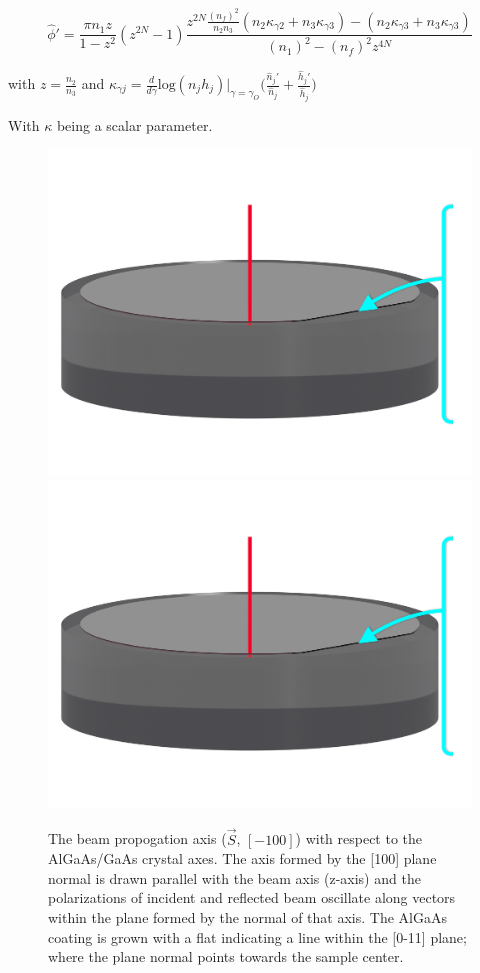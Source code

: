 \begin{equation}
\hat{\phi}' = \frac{\pi n_1 z}{1-z^2}(z^{2N} -1) \frac{z^{2N} \frac{(n_f)^2}{n_2 n_3}(n_2 \kappa_{\gamma 2} + n_3\kappa_{\gamma 3}) - (n_2 \kappa_{\gamma 3} + n_3\kappa_{\gamma 3})}{(n_1)^2 -(n_f)^2 z^{4N}}
\end{equation}

with $z = \frac{n_2}{n_3}$
and
$
\kappa_{\gamma j} = \frac{d}{d \gamma} \mathrm{log}(n_j h_j)|_{\gamma =\gamma_{O}} \bigg(\frac{\hat{n}_j'}{\hat{n}_j} +\frac{\hat{h}_j'}{\hat{h}_j} \bigg)
$

With $\kappa$ being a scalar parameter.

\begin{figure}[!ht]
    \begin{subcaptiongroup}
	    \includegraphics[width=.55\textwidth,page=1]{figs/ALGAAS/ALGAAS_HR_layers_1.pdf}
	    \label{HRiso}
	    \includegraphics[width=.55\textwidth,page=2]{figs/ALGAAS/ALGAAS_HR_layers_1.pdf}
	    \label{HRxsection}
    \end{subcaptiongroup}
\caption{The beam propogation axis ($\vec{S}$, $[-100]$) with respect to the AlGaAs/GaAs crystal axes. The axis formed by the [100] plane normal is drawn parallel with the beam axis (z-axis) and the polarizations of incident and reflected beam oscillate along vectors within the plane formed by the normal of that axis. The AlGaAs coating is grown with a flat indicating a line within the [0-11] plane; where the plane normal points towards the sample center.}
\label{fig:HRlayers}
\end{figure}


